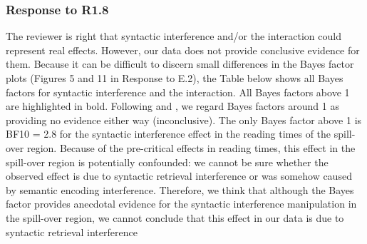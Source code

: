 \documentclass[12pt]{article}
\begin{document}
\subsubsection*{Response to R1.8}
The reviewer is right that syntactic interference and/or the interaction could represent real effects. However, our data does not provide conclusive evidence for them. Because it can be difficult to discern small differences in the Bayes factor plots (Figures 5 and 11 in Response to E.2), the Table below shows all Bayes factors for syntactic interference and the interaction. All Bayes factors above 1 are highlighted in bold. Following \textcite{jeffreys1998theory} and \textcite{lee2014bayesian}, we regard Bayes factors around 1 as providing no evidence either way (inconclusive). The only Bayes factor above 1 is BF10 = 2.8 for the syntactic interference effect in the reading times of the spill-over region. Because of the pre-critical effects in reading times, this effect in the spill-over region is potentially confounded: we cannot be sure whether the observed effect is due to syntactic retrieval interference or was somehow caused by semantic encoding interference. Therefore, we think that although the Bayes factor provides anecdotal evidence for the syntactic interference manipulation in the spill-over region, we cannot conclude that this effect in our data is due to syntactic retrieval interference
\end{document}
